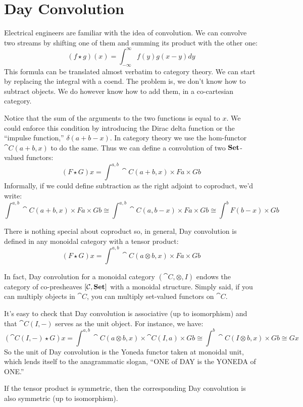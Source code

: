\documentclass[DaoFP]{subfiles}
\begin{document}
\section{Day Convolution}

Electrical engineers are familiar with the idea of convolution. We can convolve two streams by shifting one of them and summing its product with the other one: 
\[ (f \star g)(x) = \int^{\infty}_{-\infty} f(y) g(x - y) dy \]
This formula can be translated almost verbatim to category theory. We can start by replacing the integral with a coend. The problem is, we don't know how to subtract objects. We do however know how to add them, in a co-cartesian category. 

Notice that the sum of the arguments to the two functions is equal to $x$. We could enforce this condition by introducing the Dirac delta function or the ``impulse function,'' $\delta(a + b - x)$. In category theory we use the hom-functor $\cat C (a + b, x)$ to do the same. Thus we can define a convolution of two $\mathbf{Set}$-valued functors:
\[ (F \star G) x = \int^{a, b} \cat C (a + b, x) \times F a \times G b \]
Informally, if we could define subtraction as the right adjoint to coproduct, we'd write:
\[ \int^{a, b} \cat C (a + b, x) \times F a \times G b \cong \int^{a, b} \cat C (a, b - x) \times F a \times G b \cong \int^b F (b - x) \times G b\]

There is nothing special about coproduct so, in general, Day convolution is defined in any monoidal category with a tensor product:
\[ (F \star G) x = \int^{a, b} \cat C (a \otimes b, x) \times F a \times G b \]

In fact, Day convolution for a monoidal category $(\cat C, \otimes, I)$ endows the category of co-presheaves $[\mathcal{C}, \mathbf{Set}]$ with a monoidal structure. Simply said, if you can multiply objects in $\cat C$, you can multiply set-valued functors on $\cat C$.

It's easy to check that Day convolution is associative (up to isomorphism) and that $\cat C(I, -)$ serves as the unit object. For instance, we have:
\[ (\cat C(I, -) \star G) x =  \int^{a, b} \cat C (a \otimes b, x) \times \cat C(I, a) \times G b \cong 
  \int^{b} \cat C (I \otimes b, x) \times  G b \cong G x\]
So the unit of Day convolution is the Yoneda functor taken at monoidal unit, which lends itself to the anagrammatic slogan, ``ONE of DAY is the YONEDA of ONE.''

If the tensor product is symmetric, then the corresponding Day convolution is also symmetric (up to isomorphism).
\end{document}
